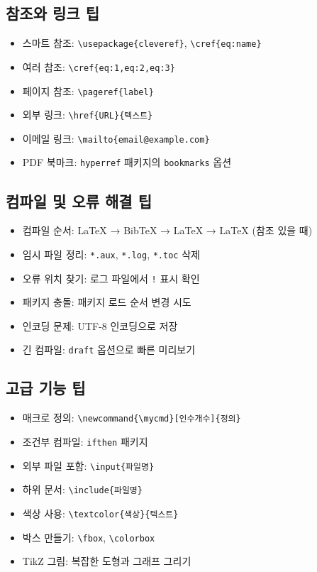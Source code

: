 \documentclass[12pt,a4paper]{article}
\begin{document}
\subsection{참조와 링크 팁}
\begin{itemize}
    \item 스마트 참조: \texttt{\textbackslash usepackage\{cleveref\}}, \texttt{\textbackslash cref\{eq:name\}}
    \item 여러 참조: \texttt{\textbackslash cref\{eq:1,eq:2,eq:3\}}
    \item 페이지 참조: \texttt{\textbackslash pageref\{label\}}
    \item 외부 링크: \texttt{\textbackslash href\{URL\}\{텍스트\}}
    \item 이메일 링크: \texttt{\textbackslash mailto\{email@example.com\}}
    \item PDF 북마크: \texttt{hyperref} 패키지의 \texttt{bookmarks} 옵션
\end{itemize}

\subsection{컴파일 및 오류 해결 팁}
\begin{itemize}
    \item 컴파일 순서: LaTeX → BibTeX → LaTeX → LaTeX (참조 있을 때)
    \item 임시 파일 정리: \texttt{*.aux}, \texttt{*.log}, \texttt{*.toc} 삭제
    \item 오류 위치 찾기: 로그 파일에서 \texttt{!} 표시 확인
    \item 패키지 충돌: 패키지 로드 순서 변경 시도
    \item 인코딩 문제: UTF-8 인코딩으로 저장
    \item 긴 컴파일: \texttt{draft} 옵션으로 빠른 미리보기
\end{itemize}

\subsection{고급 기능 팁}
\begin{itemize}
    \item 매크로 정의: \texttt{\textbackslash newcommand\{\textbackslash mycmd\}[인수개수]\{정의\}}
    \item 조건부 컴파일: \texttt{ifthen} 패키지
    \item 외부 파일 포함: \texttt{\textbackslash input\{파일명\}}
    \item 하위 문서: \texttt{\textbackslash include\{파일명\}}
    \item 색상 사용: \texttt{\textbackslash textcolor\{색상\}\{텍스트\}}
    \item 박스 만들기: \texttt{\textbackslash fbox}, \texttt{\textbackslash colorbox}
    \item TikZ 그림: 복잡한 도형과 그래프 그리기
\end{itemize}
\end{document}
